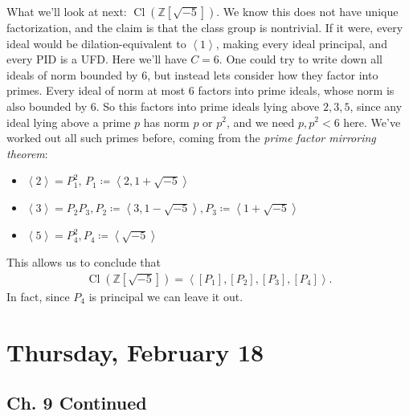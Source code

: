 \begin{example}[?]

What we'll look at next:
\(\operatorname{Cl}( {\mathbb{Z}}[ \sqrt{-5} ])\). We know this does not
have unique factorization, and the claim is that the class group is
nontrivial. If it were, every ideal would be dilation-equivalent to
\(\left\langle{ 1 }\right\rangle\), making every ideal principal, and
every PID is a UFD. Here we'll have \(C=6\). One could try to write down
all ideals of norm bounded by 6, but instead lets consider how they
factor into primes. Every ideal of norm at most 6 factors into prime
ideals, whose norm is also bounded by 6. So this factors into prime
ideals lying above \(2,3,5\), since any ideal lying above a prime \(p\)
has norm \(p\) or \(p^2\), and we need \(p, p^2 < 6\) here. We've worked
out all such primes before, coming from the \emph{prime factor mirroring
theorem}:

\begin{itemize}
\tightlist
\item
  \(\left\langle{ 2 }\right\rangle= P_1^2,\, P_1 \coloneqq\left\langle{ 2, 1 + \sqrt{-5} }\right\rangle\)
\item
  \(\left\langle{ 3 }\right\rangle = P_2 P_3, P_2 \coloneqq\left\langle{ 3, 1 - \sqrt{-5} }\right\rangle, P_3 \coloneqq\left\langle{ 1 + \sqrt{-5} }\right\rangle\)
\item
  \(\left\langle{ 5 }\right\rangle= P_4^2, P_4 \coloneqq\left\langle{ \sqrt{-5} }\right\rangle\)
\end{itemize}

This allows us to conclude that
\begin{align*}
\operatorname{Cl}({\mathbb{Z}}[ \sqrt{-5} ]) = \left\langle{ [P_1], [P_2], [P_3], [P_4] }\right\rangle
.\end{align*}
In fact, since \(P_4\) is principal we can leave it out.

\end{example}

\hypertarget{thursday-february-18}{%
\section{Thursday, February 18}\label{thursday-february-18}}

\hypertarget{ch.-9-continued}{%
\subsection{Ch. 9 Continued}\label{ch.-9-continued}}

